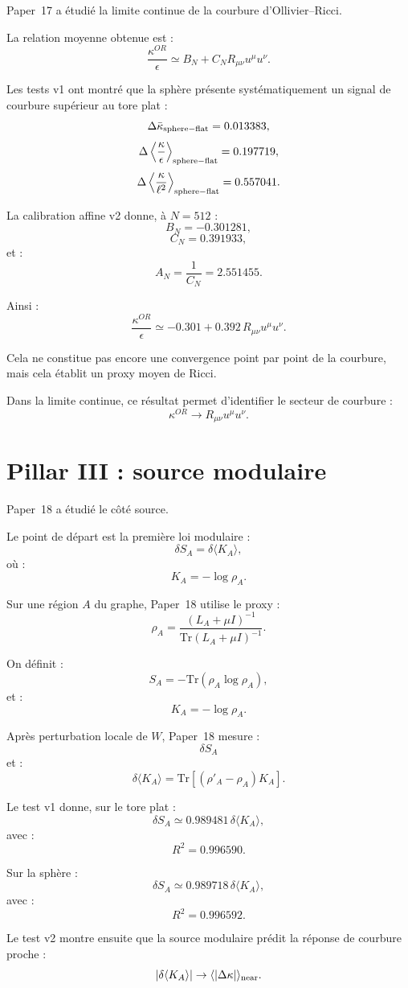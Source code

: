\documentclass[11pt,a4paper]{article}
\begin{document}
Paper~17 a étudié la limite continue de la courbure d'Ollivier--Ricci.

La relation moyenne obtenue est :
\[
\frac{\kappa^{OR}}{\epsilon}
\simeq
B_N+C_N R_{\mu\nu}u^\mu u^\nu.
\]

Les tests v1 ont montré que la sphère présente systématiquement un signal de
courbure supérieur au tore plat :
\[
\Delta\bar\kappa_{\rm sphere-flat}=0.013383,
\]
\[
\Delta
\left\langle
\frac{\kappa}{\epsilon}
\right\rangle_{\rm sphere-flat}
=
0.197719,
\]
\[
\Delta
\left\langle
\frac{\kappa}{\ell^2}
\right\rangle_{\rm sphere-flat}
=
0.557041.
\]

La calibration affine v2 donne, à \(N=512\) :
\[
B_N=-0.301281,
\]
\[
C_N=0.391933,
\]
et :
\[
A_N=\frac{1}{C_N}=2.551455.
\]

Ainsi :
\[
\frac{\kappa^{OR}}{\epsilon}
\simeq
-0.301
+
0.392\,R_{\mu\nu}u^\mu u^\nu.
\]

Cela ne constitue pas encore une convergence point par point de la courbure,
mais cela établit un proxy moyen de Ricci.

Dans la limite continue, ce résultat permet d'identifier le secteur de
courbure :
\[
\kappa^{OR}
\to
R_{\mu\nu}u^\mu u^\nu.
\]

\section{Pillar III : source modulaire}

Paper~18 a étudié le côté source.

Le point de départ est la première loi modulaire :
\[
\delta S_A
=
\delta\langle K_A\rangle,
\]
où :
\[
K_A=-\log\rho_A.
\]

Sur une région \(A\) du graphe, Paper~18 utilise le proxy :
\[
\rho_A
=
\frac{(L_A+\mu I)^{-1}}
{\mathrm{Tr}(L_A+\mu I)^{-1}}.
\]

On définit :
\[
S_A=-\mathrm{Tr}(\rho_A\log\rho_A),
\]
et :
\[
K_A=-\log\rho_A.
\]

Après perturbation locale de \(W\), Paper~18 mesure :
\[
\delta S_A
\]
et :
\[
\delta\langle K_A\rangle
=
\mathrm{Tr}\left[(\rho'_A-\rho_A)K_A\right].
\]

Le test v1 donne, sur le tore plat :
\[
\delta S_A
\simeq
0.989481\,\delta\langle K_A\rangle,
\]
avec :
\[
R^2=0.996590.
\]

Sur la sphère :
\[
\delta S_A
\simeq
0.989718\,\delta\langle K_A\rangle,
\]
avec :
\[
R^2=0.996592.
\]

Le test v2 montre ensuite que la source modulaire prédit la réponse de
courbure proche :
\[
|\delta\langle K_A\rangle|
\to
\langle|\Delta\kappa|\rangle_{\rm near}.
\]
\end{document}
